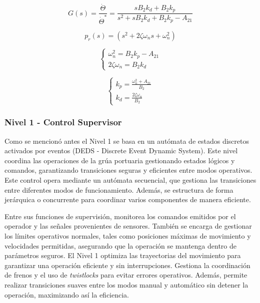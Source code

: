 \documentclass{article}
\begin{document}
            \begin{equation}
                G(s)=\frac{\dot{\Theta}}{\dot{\Theta}^*}=\frac{s B_{2} k_d + B_{2} k_p}{s^2 + s B_{2} k_d + B_{2} k_p - A_{21}}
            \end{equation}

            \begin{equation}
                p_r(s)=(s^2+2\zeta\omega_n s+\omega_n^2)
            \end{equation}

            \begin{equation}
                \begin{cases}
                    \omega_n^2 = B_{2} k_p - A_{21}\\
                    2\zeta\omega_n = B_{2} k_d
                \end{cases}
            \end{equation}

            \begin{equation}
                \begin{cases}
                    k_p = \frac{\omega_n^2 + A_{21}}{B_{2}}\\
                    k_d = \frac{2\zeta\omega_n}{B_{2}}
                \end{cases}
            \end{equation}

        

        \subsubsection{Nivel 1 - Control Supervisor}

        Como se mencionó antes el Nivel 1 se basa en un autómata de estados discretos activados por eventos (DEDS - Discrete Event Dynamic System). Este nivel coordina las operaciones de la grúa portuaria gestionando estados lógicos y comandos, garantizando transiciones seguras y eficientes entre modos operativos. Este control opera mediante un autómata secuencial, que gestiona las transiciones entre diferentes modos de funcionamiento. Además, se estructura de forma jerárquica o concurrente para coordinar varios componentes de manera eficiente.

        Entre sus funciones de supervisión, monitorea los comandos emitidos por el operador y las señales provenientes de sensores. También se encarga de gestionar los límites operativos normales, tales como posiciones máximas de movimiento y velocidades permitidas, asegurando que la operación se mantenga dentro de parámetros seguros.
        El Nivel 1 optimiza las trayectorias del movimiento para garantizar una operación eficiente y sin interrupciones. Gestiona la coordinación de frenos y el uso de \textit{twistlocks} para evitar errores operativos. Además, permite realizar transiciones suaves entre los modos manual y automático sin detener la operación, maximizando así la eficiencia.
\end{document}

